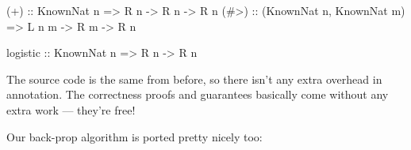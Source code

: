 \documentclass[]{article}
\newenvironment{Shaded}{}{}
\newcommand{\DataTypeTok}[1]{\textcolor[rgb]{0.56,0.13,0.00}{{#1}}}
\newcommand{\OtherTok}[1]{\textcolor[rgb]{0.00,0.44,0.13}{{#1}}}
\newcommand{\NormalTok}[1]{{#1}}
\begin{document}
\begin{Shaded}
\begin{Highlighting}[]
\OtherTok{(+)  ::} \DataTypeTok{KnownNat} \NormalTok{n}
     \OtherTok{=>} \DataTypeTok{R} \NormalTok{n }\OtherTok{->} \DataTypeTok{R} \NormalTok{n }\OtherTok{->} \DataTypeTok{R} \NormalTok{n}
\OtherTok{(#>) ::} \NormalTok{(}\DataTypeTok{KnownNat} \NormalTok{n, }\DataTypeTok{KnownNat} \NormalTok{m)}
     \OtherTok{=>} \DataTypeTok{L} \NormalTok{n m }\OtherTok{->} \DataTypeTok{R} \NormalTok{m }\OtherTok{->} \DataTypeTok{R} \NormalTok{n}

\OtherTok{logistic ::} \DataTypeTok{KnownNat} \NormalTok{n}
         \OtherTok{=>} \DataTypeTok{R} \NormalTok{n }\OtherTok{->} \DataTypeTok{R} \NormalTok{n}
\end{Highlighting}
\end{Shaded}

The source code is the same from before, so there isn't any extra
overhead in annotation. The correctness proofs and guarantees basically
come without any extra work --- they're free!

Our back-prop algorithm is ported pretty nicely too:
\end{document}

